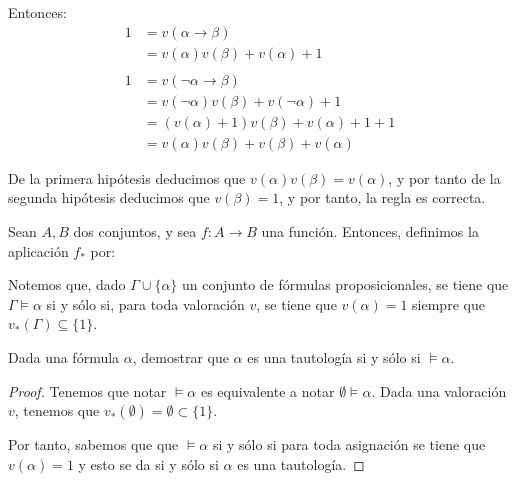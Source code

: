 \begin{ejercicio*}
\begin{enumerate}
        Entonces:
        \begin{align*}
            1 &= v(\alpha\rightarrow\beta)\\
            &= v(\alpha)v(\beta)+v(\alpha)+1\\ \\
            1 &= v(\lnot\alpha\rightarrow\beta)\\
            &= v(\lnot\alpha)v(\beta)+v(\lnot\alpha)+1\\
            &= (v(\alpha)+1)v(\beta)+v(\alpha)+1+1\\
            &= v(\alpha)v(\beta)+v(\beta)+v(\alpha)
        \end{align*}

        De la primera hipótesis deducimos que $v(\alpha)v(\beta)=v(\alpha)$,
        y por tanto de la segunda hipótesis deducimos que $v(\beta)=1$, y por tanto, la regla es correcta.
    \end{enumerate}

\end{ejercicio*}

\begin{observacion}
    Sean $A,B$ dos conjuntos, y sea $f:A\to B$ una función. Entonces, definimos la aplicación $f_\ast$ por:

    Notemos que, dado $\Gamma \cup \{\alpha\}$ un conjunto de fórmulas proposicionales,
    se tiene que $\Gamma \models \alpha$ si y sólo si, para toda valoración $v$, se tiene que $v(\alpha)=1$ siempre que $v_\ast(\Gamma)\subseteq \{1\}$.
\end{observacion}

\begin{prop}
    Dada una fórmula $\alpha$, demostrar que
    $\alpha$ es una tautología si y sólo si $\models\alpha$.
    \begin{proof}

        Tenemos que notar $\models\alpha$ es equivalente a notar $\emptyset\models\alpha$.
        Dada una valoración $v$, tenemos que $v_\ast(\emptyset )=\emptyset \subset \{1\}$.
        
        Por tanto, sabemos que que $\models\alpha$ si y sólo si
        para toda asignación se tiene que $v(\alpha)=1$ y esto se da si y sólo si $\alpha$ es una tautología.
    \end{proof}
    
\end{prop}

